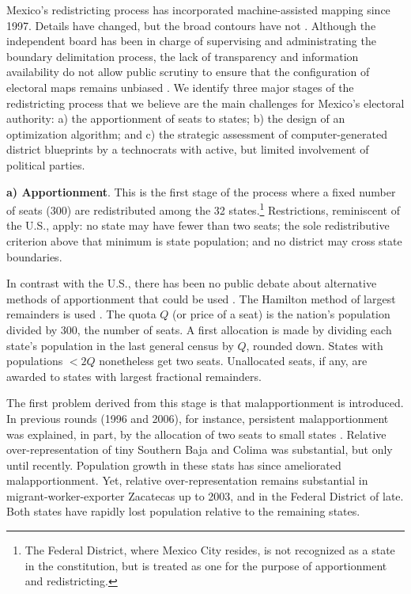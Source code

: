 \documentclass[letter,12pt]{article}
\begin{document}
Mexico's redistricting process has incorporated machine-assisted mapping since 1997. Details have changed, but the broad contours have not \citep{trelles.mtz.tesisItam.2007}. Although the independent board has been in charge of supervising and administrating the boundary delimitation process, the lack of transparency and information availability do not allow public scrutiny to ensure that the configuration of electoral maps remains unbiased \citep{trelles.datosabiertos.2015}. We identify three major stages of the redistricting process that we believe are the main challenges for Mexico's electoral authority: a) the apportionment of seats to states; b) the design of an optimization algorithm; and c) the strategic assessment of computer-generated district blueprints by a technocrats with active, but limited involvement of political parties.

\textbf{a) Apportionment}. This is the first stage of the process where a fixed number of seats (300) are redistributed among the 32 states.\footnote{The Federal District, where Mexico City resides, is not recognized as a state in the constitution, but is treated as one for the purpose of apportionment and redistricting.} Restrictions, reminiscent of the U.S., apply: no state may have fewer than two seats; the sole redistributive criterion above that minimum is state population; and no district may cross state boundaries.  

In contrast with the U.S., there has been no public debate about alternative methods of apportionment that could be used \citep{szpiro.numbersRule.2010,balinski.rodriguez.1996}. The Hamilton method of largest remainders is used \citep[][:10]{balinskiYoung2001FairRep}. The quota $Q$ (or price of a seat) is the nation's population divided by 300, the number of seats. A first allocation is made by dividing each state's population in the last general census by $Q$, rounded down. States with populations $<2Q$ nonetheless get two seats. Unallocated seats, if any, are awarded to states with largest fractional remainders. 

The first problem derived from this stage is that malapportionment is introduced. In previous rounds (1996 and 2006), for instance, persistent malapportionment was explained, in part, by the allocation of two seats to small states \citep{magar.etalBiasMultiParty2015}. Relative over-representation of tiny Southern Baja and Colima was substantial, but only until recently. Population growth in these stats has since ameliorated malapportionment. Yet, relative over-representation remains substantial in migrant-worker-exporter Zacatecas up to 2003, and in the Federal District of late. Both states have rapidly lost population relative to the remaining states.
\end{document}
